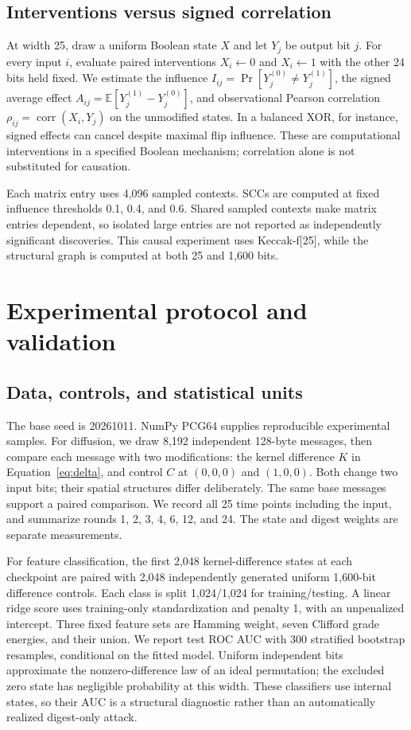 \documentclass[11pt]{article}
\newcommand{\E}{\mathbb{E}}
\begin{document}
\subsection{Interventions versus signed correlation}

At width 25, draw a uniform Boolean state $X$ and let $Y_j$ be output bit $j$. For every input $i$, evaluate paired interventions $X_i\leftarrow0$ and $X_i\leftarrow1$ with the other 24 bits held fixed. We estimate the influence $I_{ij}=\Pr[Y_j^{(0)}\ne Y_j^{(1)}]$, the signed average effect $A_{ij}=\E[Y_j^{(1)}-Y_j^{(0)}]$, and observational Pearson correlation $\rho_{ij}=\operatorname{corr}(X_i,Y_j)$ on the unmodified states. In a balanced XOR, for instance, signed effects can cancel despite maximal flip influence. These are computational interventions in a specified Boolean mechanism; correlation alone is not substituted for causation.

Each matrix entry uses 4,096 sampled contexts. SCCs are computed at fixed influence thresholds 0.1, 0.4, and 0.6. Shared sampled contexts make matrix entries dependent, so isolated large entries are not reported as independently significant discoveries. This causal experiment uses Keccak-f[25], while the structural graph is computed at both 25 and 1,600 bits.

\section{Experimental protocol and validation}

\subsection{Data, controls, and statistical units}

The base seed is 20261011. NumPy PCG64 supplies reproducible experimental samples. For diffusion, we draw 8,192 independent 128-byte messages, then compare each message with two modifications: the kernel difference $K$ in Equation~\eqref{eq:delta}, and control $C$ at $(0,0,0)$ and $(1,0,0)$. Both change two input bits; their spatial structures differ deliberately. The same base messages support a paired comparison. We record all 25 time points including the input, and summarize rounds 1, 2, 3, 4, 6, 12, and 24. The state and digest weights are separate measurements.

For feature classification, the first 2,048 kernel-difference states at each checkpoint are paired with 2,048 independently generated uniform 1,600-bit difference controls. Each class is split 1,024/1,024 for training/testing. A linear ridge score uses training-only standardization and penalty 1, with an unpenalized intercept. Three fixed feature sets are Hamming weight, seven Clifford grade energies, and their union. We report test ROC AUC with 300 stratified bootstrap resamples, conditional on the fitted model. Uniform independent bits approximate the nonzero-difference law of an ideal permutation; the excluded zero state has negligible probability at this width. These classifiers use internal states, so their AUC is a structural diagnostic rather than an automatically realized digest-only attack.
\end{document}
